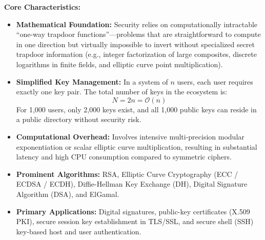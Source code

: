 \textbf{Core Characteristics:}
\begin{itemize}
\item \textbf{Mathematical Foundation:} Security relies on computationally intractable ``one-way trapdoor functions''—problems that are straightforward to compute in one direction but virtually impossible to invert without specialized secret trapdoor information (e.g., integer factorization of large composites, discrete logarithms in finite fields, and elliptic curve point multiplication).
\item \textbf{Simplified Key Management:} In a system of $n$ users, each user requires exactly one key pair. The total number of keys in the ecosystem is:
\[ N = 2n = \mathcal{O}(n) \]
For 1,000 users, only 2,000 keys exist, and all 1,000 public keys can reside in a public directory without security risk.
\item \textbf{Computational Overhead:} Involves intensive multi-precision modular exponentiation or scalar elliptic curve multiplication, resulting in substantial latency and high CPU consumption compared to symmetric ciphers.
\item \textbf{Prominent Algorithms:} RSA, Elliptic Curve Cryptography (ECC / ECDSA / ECDH), Diffie-Hellman Key Exchange (DH), Digital Signature Algorithm (DSA), and ElGamal.
\item \textbf{Primary Applications:} Digital signatures, public-key certificates (X.509 PKI), secure session key establishment in TLS/SSL, and secure shell (SSH) key-based host and user authentication.
\end{itemize}

